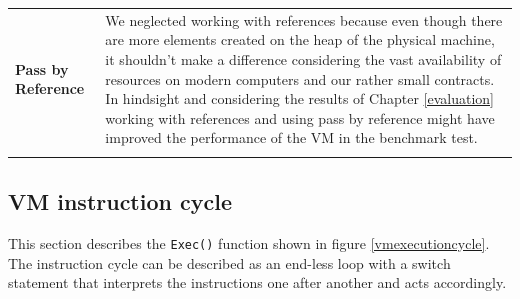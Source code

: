 \begin{tabular}[t]{ p{3cm} p{12.5cm}}
\raggedright
\textbf{Pass by Reference} &
We neglected working with references because even though there are more elements created on the heap of the physical machine, it shouldn't make a difference considering the vast availability of resources on modern computers and our rather small contracts. In hindsight and considering the results of Chapter \ref{evaluation} working with references and using pass by reference might have improved the performance of the VM in the benchmark test. \\ \\
\end{tabular}

\subsection{VM instruction cycle} \label{exec_cycle}
This section describes the \texttt{Exec()} function shown in figure \ref{vmexecutioncycle}. The instruction cycle can be described as an end-less loop with a switch statement that interprets the instructions one after another and acts accordingly.

